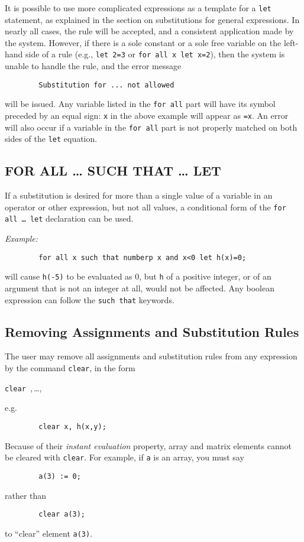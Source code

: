It is possible to use more complicated expressions as a template for a
\texttt{let} statement, as explained in the section on substitutions for
general expressions.  In nearly all cases, the rule will be accepted, and
a consistent application made by the system.  However, if there is a sole
constant or a sole free variable on the left-hand side of a rule (e.g.,
\texttt{let 2=3} or \texttt{for all x let x=2}), then the system is unable to
handle the rule, and the error message
\begin{verbatim}
        Substitution for ... not allowed
\end{verbatim}
will be issued.  Any variable listed in the \texttt{for all} part will have
its symbol preceded by an equal sign: \texttt{x} in the above example will
appear as \texttt{=x}.  An error will also occur if a variable in the
\texttt{for all} part is not properly matched on both sides of the \texttt{let}
equation.

\subsection{FOR ALL \ldots{} SUCH THAT \ldots{} LET}
\hypertarget{command:SUCHTHAT}{}

If a substitution is desired for more than a single value of a variable in
an operator or other expression, but not all values, a conditional form of
the \texttt{for all \ldots{} let} declaration can be used.

\textit{Example:}
\begin{verbatim}
        for all x such that numberp x and x<0 let h(x)=0;
\end{verbatim}
will cause \texttt{h(-5)} to be evaluated as 0, but \texttt{h} of a positive
integer, or of an argument that is not an integer at all, would not be
affected.  Any boolean expression can follow the \texttt{such that} keywords.

\hypertarget{reserved:CLEAR}{\subsection{Removing Assignments and Substitution Rules}}

The user may remove all assignments and substitution rules from any
expression by the command \texttt{clear}, in the form
\begin{syntax}
  \texttt{clear },\,\dots,\,
\end{syntax}
e.g.
\begin{verbatim}
        clear x, h(x,y);
\end{verbatim}
Because of their \emph{instant evaluation} property, array and matrix elements
cannot be cleared with \texttt{clear}.  For example, if \texttt{a} is an array,
you must say
\begin{verbatim}
        a(3) := 0;
\end{verbatim}
rather than
\begin{verbatim}
        clear a(3);
\end{verbatim}
to ``clear'' element \texttt{a(3)}.

